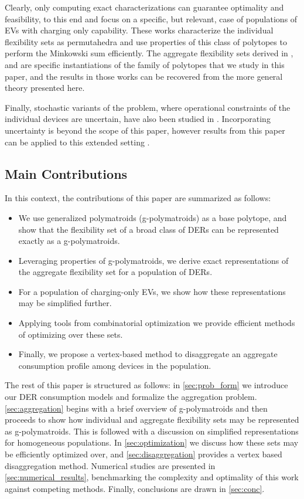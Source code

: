 Clearly, only computing exact characterizations can guarantee optimality and feasibility, to this end \cite{Panda2024EfficientVehicles} and \cite{Mukhi2023AnVehicles} focus on a specific, but relevant, case of populations of EVs with charging only capability. These works characterize the individual flexibility sets as permutahedra and use properties of this class of polytopes to perform the Minkowski sum efficiently. The aggregate flexibility sets derived in \cite{Wen2022AggregateModels}, \cite{Mukhi2023AnVehicles}
 and \cite{Panda2024EfficientVehicles} are specific instantiations of the family of polytopes that we study in this paper, and the results in those works can be recovered from the more general theory presented here. 

 Finally, stochastic variants of the problem, where operational constraints of the individual devices are uncertain, have also been studied in \cite{Taheri2022Data-DrivenModels, Zhang2024AUncertainty}. Incorporating uncertainty is beyond the scope of this paper, however results from this paper can be applied to this extended setting \cite{Mukhi2025RobustFlexibility}. 
\subsection{Main Contributions}
 In this context, the contributions of this paper are summarized as follows:
\begin{itemize}
    \item We use generalized polymatroids (g-polymatroids) as a base polytope, and show that the flexibility set of a broad class of DERs can be represented exactly as a g-polymatroids. 
    \item Leveraging properties of g-polymatroids, we derive exact representations of the aggregate flexibility set for a population of DERs.
    \item For a population of  charging-only EVs, we show how these representations may be simplified further.
    \item Applying tools from combinatorial optimization we provide efficient methods of optimizing over these sets.
    \item Finally, we propose a vertex-based method to disaggregate an aggregate consumption profile among devices in the population.
\end{itemize}


The rest of this paper is structured as follows: in \cref{sec:prob_form} we introduce our DER consumption models and formalize the aggregation problem. \cref{sec:aggregation} begins with a brief overview of g-polymatroids and then proceeds to show how individual and aggregate flexibility sets may be represented as g-polymatroids. This is followed with a discussion on simplified representations for homogeneous populations.
In \cref{sec:optimization} we discuss how these sets may be efficiently optimized over, and \cref{sec:disaggregation} provides a vertex based disaggregation method. Numerical studies are presented in \cref{sec:numerical_results}, benchmarking the complexity and optimality of this work against competing methods. Finally, conclusions are drawn in \cref{sec:conc}. 


